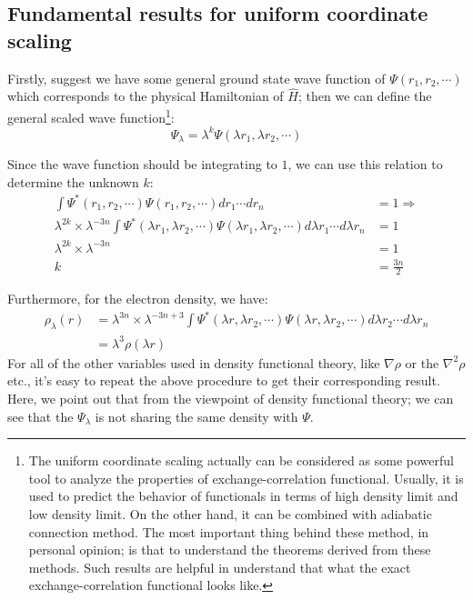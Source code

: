 \subsection{Fundamental results for uniform coordinate scaling}
%
%
%
Firstly, suggest we have some general ground state wave function of
$\Psi(r_{1},r_{2},\cdots)$ which corresponds to the physical
Hamiltonian of $\hat{H}$; then we can define the general scaled wave
function\footnote{The uniform coordinate scaling actually can be considered 
as some powerful tool to analyze the properties of exchange-correlation
functional. Usually, it is used to predict the behavior of functionals in
terms of  high density limit and low density
limit\cite{PhysRevA.32.2010,PhysRevA.43.4637}. On the other hand, it
can be combined with adiabatic connection
method\cite{PhysRevA.43.4637,PhysRevA.50.196,PhysRevB.47.13105}. The most 
important thing behind these method, in personal opinion; is that to
understand the theorems derived from these methods. Such results are helpful
in understand that what the exact exchange-correlation functional looks like. 
}:
\begin{equation}
 \label{Uniform_coord_scaling_eq:1} 
\Psi_{\lambda} =
\lambda^{k}\Psi(\lambda r_{1},\lambda r_{2},\cdots)
\end{equation}

Since the wave function should be integrating to $1$, we can use this
relation to determine the unknown $k$:
\begin{align}
 \label{Uniform_coord_scaling_eq:2}
\int \Psi^{*}(r_{1},
r_{2},\cdots)\Psi(r_{1},r_{2},\cdots) dr_{1}\cdots dr_{n} &= 1
\Rightarrow \nonumber \\
\lambda^{2k}\times\lambda^{-3n}\int \Psi^{*}(\lambda r_{1},\lambda r_{2},\cdots)
\Psi(\lambda r_{1},\lambda r_{2},\cdots) d\lambda r_{1}\cdots d\lambda r_{n}
& = 1 \nonumber \\  
\lambda^{2k}\times\lambda^{-3n} &= 1\nonumber \\
k &= \frac{3n}{2}
\end{align}

Furthermore, for the electron density, we have:
\begin{equation}
\label{Uniform_coord_scaling_eq:3}
\begin{split}
\rho_{\lambda}(r) &= \lambda^{3n}\times\lambda^{-3n+3}
\int \Psi^{*}(\lambda r,\lambda r_{2},\cdots)
\Psi(\lambda r,\lambda r_{2},\cdots) d\lambda r_{2}\cdots d\lambda r_{n} \\
&= \lambda^{3}\rho(\lambda r)
\end{split}
\end{equation}
For all of the other variables used in density functional theory, like
$\nabla\rho$ or the $\nabla^{2}\rho$ etc., it's easy to repeat the above
procedure to get their corresponding result. Here, we point out that from 
the viewpoint of density functional theory; we can see that the
$\Psi_{\lambda}$ is not sharing the same density with $\Psi$.

